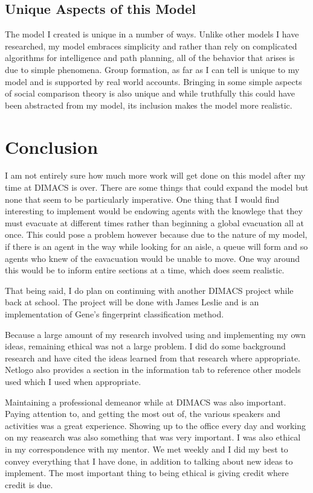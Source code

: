 \documentclass{article}
\begin{document}
\subsection{Unique Aspects of this Model}
The model I created is unique in a number of ways. Unlike other models I have researched, my model embraces simplicity and rather than rely on complicated algorithms for intelligence and path planning, all of the behavior that arises is due to simple phenomena. Group formation, as far as I can tell is unique to my model and is supported by real world accounts. Bringing in some simple aspects of social comparison theory is also unique and while truthfully this could have been abstracted from my model, its inclusion makes the model more realistic.

\section{Conclusion}
I am not entirely sure how much more work will get done on this model after my time at DIMACS is over. There are some things that could expand the model but none that seem to be particularly imperative. One thing that I would find interesting to implement would be endowing agents with the knowlege that they must evacuate at different times rather than beginning a global evacuation all at once. This could pose a problem however because due to the nature of my model, if there is an agent in the way while looking for an aisle, a queue will form and so agents who knew of the eavacuation would be unable to move. One way around this would be to inform entire sections at a time, which does seem realistic. 

That being said, I do plan on continuing with another DIMACS project while back at school. The project will be done with James Leslie and is an implementation of Gene's fingerprint classification method.

Because a large amount of my research involved using and implementing my own ideas, remaining ethical was not a large problem. I did do some background research and have cited the ideas learned from that research where appropriate. Netlogo also provides a section in the information tab to reference other models used which I used when appropriate. 

Maintaining a professional demeanor while at DIMACS was also important. Paying attention to, and getting the most out of, the various speakers and activities was a great experience. Showing up to the office every day and working on my reasearch was also something that was very important. I was also ethical in my correspondence with my mentor. We met weekly and I did my best to convey everything that I have done, in addition to talking about new ideas to implement. The most important thing to being ethical is giving credit where credit is due.
\end{document}

